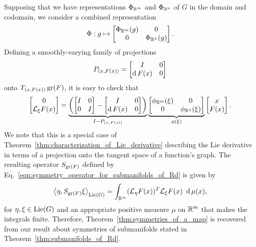 \documentclass[twoside,11pt]{article}
\begin{document}
Supposing that we have representations $\Phi_{\mathbb{R}^m}$ and $\Phi_{\mathbb{R}^n}$ of $G$ in the domain and codomain, we consider a combined representation
\begin{equation}
    \Phi: g \mapsto \begin{bmatrix}
        \Phi_{\mathbb{R}^m}(g) & 0 \\
        0 & \Phi_{\mathbb{R}^n}(g)
    \end{bmatrix}.
\end{equation}
Defining a smoothly-varying family of projections 
\begin{equation}
    P_{(x,F(x))} = \begin{bmatrix}
        I & 0 \\
        \operatorname{\mathrm{d}} F(x) & 0
    \end{bmatrix}
    \label{eqn:graph_projection}
\end{equation}
onto $T_{(x,F(x))}\operatorname{gr}(F)$,
it is easy to check that
\begin{equation}
    \begin{bmatrix}
        0 \\
        {\mathcal{L}}_\xi F (x)
    \end{bmatrix}
    = \underbrace{\left( \begin{bmatrix}
        I & 0 \\
        0 & I
    \end{bmatrix} - \begin{bmatrix}
        I & 0 \\
        \operatorname{\mathrm{d}} F(x) & 0
    \end{bmatrix} \right)}_{I-P_{(x,F(x))}} 
    \underbrace{
    \begin{bmatrix}
        \phi_{\mathbb{R}^m}(\xi) & 0 \\
        0 & \phi_{\mathbb{R}^n}(\xi)
    \end{bmatrix}}_{\phi(\xi)}
    \begin{bmatrix}
        x \\
        F(x)
    \end{bmatrix}.
    \label{eqn:Lie_derivative_as_projection_for_real_maps}
\end{equation}
We note that this is a special case of Theorem~\ref{thm:characterization_of_Lie_derivative} describing the Lie derivative in terms of a projection onto the tangent space of a function's graph.
The resulting operator $S_{\operatorname{gr}(F)}$ defined by Eq.~\ref{eqn:symmetry_operator_for_submanifolds_of_Rd} is given by
\begin{equation}
    \left\langle \eta, S_{\operatorname{gr}(F)} \xi \right\rangle_{\operatorname{Lie}(G)} 
    = \int_{\mathbb{R}^m} ({\mathcal{L}}_\eta F(x))^T {\mathcal{L}}_\xi F(x) \ \operatorname{\mathrm{d}} \mu(x),
\end{equation}
for $\eta,\xi\in\operatorname{Lie}(G)$ and an appropriate positive measure $\mu$ on $\mathbb{R}^m$ that makes the integrals finite.
Therefore, Theorem~\ref{thm:symmetries_of_a_map} is recovered from our result about symmetries of submanifolds stated in Theorem~\ref{thm:submanifolds_of_Rd}.
\end{document}
